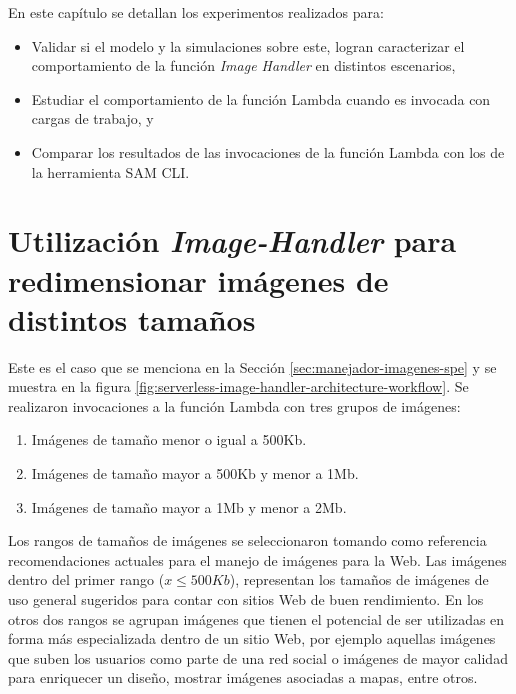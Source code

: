 En este capítulo se detallan los experimentos realizados para:
\begin{itemize}
    \item Validar si el modelo y la simulaciones sobre este, logran caracterizar el comportamiento de la función \emph{Image Handler} en distintos escenarios, 
    \item Estudiar el comportamiento de la función Lambda cuando es invocada con cargas de trabajo, y
    \item Comparar los resultados de las invocaciones de la función Lambda con los de la herramienta SAM CLI.
\end{itemize}

\section{Utilización \emph{Image-Handler} para redimensionar imágenes de distintos tamaños} \label{sec:experimento-1}

Este es el caso que se menciona en la Sección \ref{sec:manejador-imagenes-spe} y se muestra en la figura \ref{fig:serverless-image-handler-architecture-workflow}. Se realizaron invocaciones a la función Lambda con tres grupos de imágenes:
\begin{enumerate}
    \item Imágenes de tamaño menor o igual a 500Kb.
    \item Imágenes de tamaño mayor a 500Kb y menor a 1Mb.
    \item Imágenes de tamaño mayor a 1Mb y menor a 2Mb.
\end{enumerate}
Los rangos de tamaños de imágenes se seleccionaron tomando como referencia recomendaciones actuales para el manejo de imágenes para la Web. Las imágenes dentro del primer rango ($x \leq 500Kb$), representan los tamaños de imágenes de uso general sugeridos para contar con sitios Web de buen rendimiento. En los otros dos rangos se agrupan imágenes que tienen el potencial de ser utilizadas en forma más especializada dentro de un sitio Web, por ejemplo aquellas imágenes que suben los usuarios como parte de una red social o imágenes de mayor calidad para enriquecer un diseño, mostrar imágenes asociadas a mapas, entre otros.


